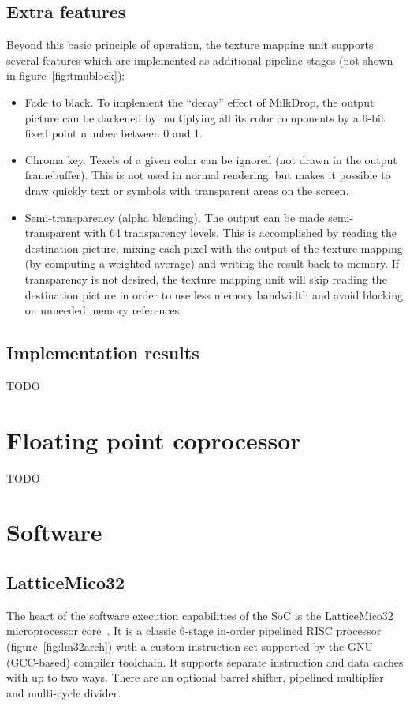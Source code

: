 \documentclass[a4paper,11pt]{kthesis}
\begin{document}
\section{Extra features}
Beyond this basic principle of operation, the texture mapping unit supports several features which are implemented as additional pipeline stages (not shown in figure~\ref{fig:tmublock}):
\begin{itemize}
\item Fade to black. To implement the ``decay'' effect of MilkDrop, the output picture can be darkened by multiplying all its color components by a 6-bit fixed point number between 0 and 1.
\item Chroma key. Texels of a given color can be ignored (not drawn in the output framebuffer). This is not used in normal rendering, but makes it possible to draw quickly text or symbols with transparent areas on the screen.
\item Semi-transparency (alpha blending). The output can be made semi-transparent with 64 transparency levels. This is accomplished by reading the destination picture, mixing each pixel with the output of the texture mapping (by computing a weighted average) and writing the result back to memory. If transparency is not desired, the texture mapping unit will skip reading the destination picture in order to use less memory bandwidth and avoid blocking on unneeded memory references.
\end{itemize}

\section{Implementation results}
TODO

\chapter{Floating point coprocessor}
\label{ch:pfpu}
TODO

\chapter{Software}
\label{ch:sw}
\section{LatticeMico32}
\label{sec:mico32}
The heart of the software execution capabilities of the SoC is the LatticeMico32 microprocessor core~\cite{mico32}. It is a classic 6-stage in-order pipelined RISC processor (figure~\ref{fig:lm32arch}) with a custom instruction set supported by the GNU (GCC-based) compiler toolchain. It supports separate instruction and data caches with up to two ways. There are an optional barrel shifter, pipelined multiplier and multi-cycle divider.
\end{document}
